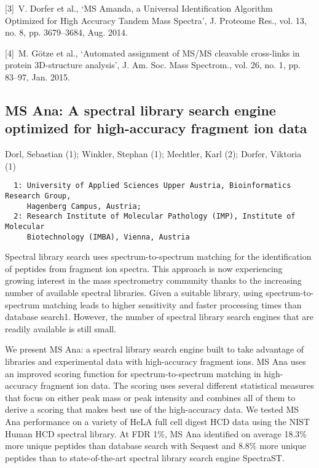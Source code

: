{[3] V. Dorfer et al., ‘MS Amanda, a Universal Identification Algorithm Optimized for High Accuracy Tandem Mass Spectra’, J. Proteome Res., vol. 13, no. 8, pp. 3679–3684, Aug. 2014.

[4] M. Götze et al., ‘Automated assignment of MS/MS cleavable cross-links in protein 3D-structure analysis’, J. Am. Soc. Mass Spectrom., vol. 26, no. 1, pp. 83–97, Jan. 2015.

\pagebreak
\subsection*{\color{eubicRed} MS Ana: A spectral library search engine optimized for high-accuracy fragment ion data}
{\color{eubicGray}Dorl, Sebastian (1);
Winkler, Stephan (1);
Mechtler, Karl (2);
Dorfer, Viktoria (1)}
{\color{eubicGray}\begin{verbatim}
  1: University of Applied Sciences Upper Austria, Bioinformatics Research Group,
     Hagenberg Campus, Austria;
  2: Research Institute of Molecular Pathology (IMP), Institute of Molecular
     Biotechnology (IMBA), Vienna, Austria

\end{verbatim}}

Spectral library search uses spectrum-to-spectrum matching for the identification of peptides from fragment ion spectra. This approach is now experiencing growing interest in the mass spectrometry community thanks to the increasing number of available spectral libraries. Given a suitable library, using spectrum-to-spectrum matching leads to higher sensitivity and faster processing times than database search1. However, the number of spectral library search engines that are readily available is still small.

We present MS Ana: a spectral library search engine built to take advantage of libraries and experimental data with high-accuracy fragment ions. MS Ana uses an improved scoring function for spectrum-to-spectrum matching in high-accuracy fragment ion data. The scoring uses several different statistical measures that focus on either peak mass or peak intensity and combines all of them to derive a scoring that makes best use of the high-accuracy data. We tested MS Ana performance on a variety of HeLA full cell digest HCD data using the NIST Human HCD spectral library. At FDR 1\%, MS Ana identified on average 18.3\% more unique peptides than database search with Sequest and 8.8\% more unique peptides than to state-of-the-art spectral library search engine SpectraST.

}
